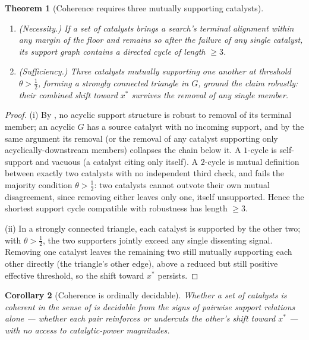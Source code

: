 \documentclass[11pt,twocolumn,a4paper]{article}
\theoremstyle{thmstyle}
\newtheorem{theorem}{Theorem}[section]
\newtheorem{corollary}[theorem]{Corollary}
\theoremstyle{definition}
\theoremstyle{remark}
\begin{document}
\begin{theorem}[Coherence requires three mutually supporting catalysts]
\label{thm:triangle}
\leavevmode
\begin{enumerate}[label=\textup{(\roman*)},leftmargin=1.8em,itemsep=2pt]
\item \emph{(Necessity.)} If a set of catalysts brings a search's terminal
alignment within any margin of the floor and remains so after the failure
of any single catalyst, its support graph contains a directed cycle of
length $\ge3$.
\item \emph{(Sufficiency.)} Three catalysts mutually supporting one
another at threshold $\theta>\tfrac12$, forming a strongly connected
triangle in $G$, ground the claim robustly: their combined shift toward
$x^{\ast}$ survives the removal of any single member.
\end{enumerate}
\end{theorem}

\begin{proof}
(i) By , no acyclic support structure is robust to
removal of its terminal member; an acyclic $G$ has a source catalyst with
no incoming support, and by the same argument its removal (or the removal
of any catalyst supporting only acyclically-downstream members) collapses
the chain below it. A $1$-cycle is self-support and vacuous (a catalyst
citing only itself). A $2$-cycle is mutual definition between exactly two
catalysts with no independent third check, and fails the majority
condition $\theta>\tfrac12$: two catalysts cannot outvote their own mutual
disagreement, since removing either leaves only one, itself unsupported.
Hence the shortest support cycle compatible with robustness has length
$\ge3$.

(ii) In a strongly connected triangle, each catalyst is supported by the
other two; with $\theta>\tfrac12$, the two supporters jointly exceed any
single dissenting signal. Removing one catalyst leaves the remaining two
still mutually supporting each other directly (the triangle's other edge),
above a reduced but still positive effective threshold, so the shift
toward $x^{\ast}$ persists.
\end{proof}

\begin{corollary}[Coherence is ordinally decidable]
\label{cor:decide}
Whether a set of catalysts is coherent in the sense of
 is decidable from the \emph{signs} of pairwise support
relations alone --- whether each pair reinforces or undercuts the other's
shift toward $x^{\ast}$ --- with no access to catalytic-power magnitudes.
\end{corollary}
\end{document}
